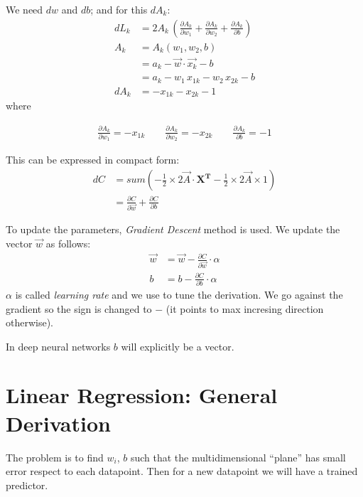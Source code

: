 We need $dw$ and $db$; and for this $dA_k$:
\begin{align*}
  dL_k  &= 2A_k\,(\frac{\partial A_k}{\partial w_1} + \frac{\partial A_k}{\partial w_2} + \frac{\partial A_k}{\partial b}) \\
  A_k &= A_k(w_1, w_2, b)\\
  &= a_k - \vec{w}\cdot{}\vec{x_k} - b\\
  &= a_k - w_1\,x_{1k} - w_2\,x_{2k}-b\\
  dA_k &= -x_{1k} - x_{2k} -1
\end{align*}
where 
\begin{center}
\begin{align*}
  \frac{\partial A_{k}}{\partial w_1} = -x_{1k}\hspace{2em} \frac{\partial A_{k}}{\partial w_2} = -x_{2k}\hspace{2em} \frac{\partial A_k}{\partial b} = -1
\end{align*} 
\end{center}

This can be expressed in compact form:
\begin{align*}
  dC &= sum(-\frac{1}{2}\times{}2\vec{A}\cdot{}\mathbf{X^T} -\frac{1}{2}\times{}2\vec{A}\times{}1)\\
  &= \frac{\partial C}{\partial \vec{w}} + \frac{\partial C}{\partial b}  
\end{align*}

To update the parameters, \textit{Gradient Descent} method is used. We update the vector $\vec{w}$ as follows:
\begin{align}
  \vec{w} &= \vec{w} -\frac{\partial C}{\partial \vec{w}}\cdot{}\alpha\\
  b &= b -\frac{\partial C}{\partial b}\cdot{}\alpha
\end{align}
$\alpha$ is called \textit{learning rate} and we use to tune the derivation. We go against the gradient so the sign is changed to $-$ (it points to max incresing direction otherwise).

In deep neural networks $b$ will explicitly be a vector.




\section{Linear Regression: General Derivation}
The problem is to find $w_i$, $b$ such that the multidimensional ``plane'' has small error respect to each datapoint. Then for a new datapoint we will have a trained predictor.

